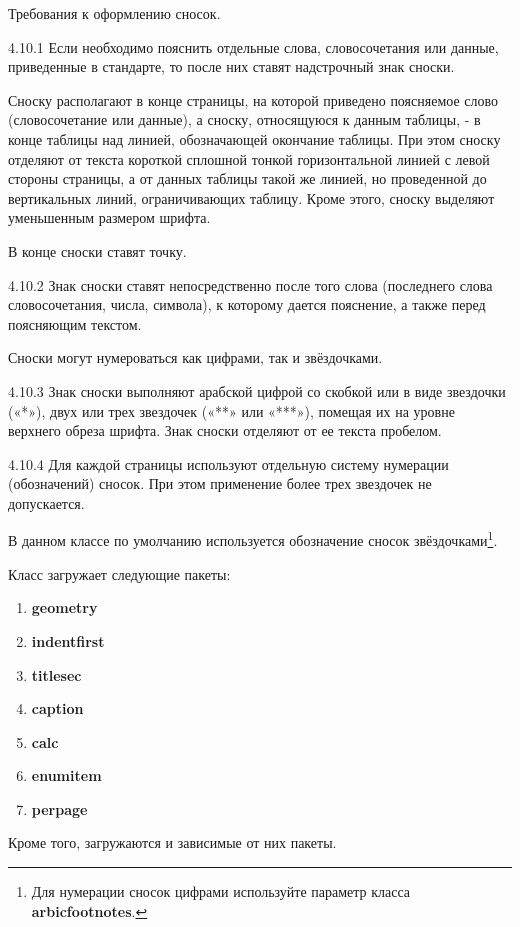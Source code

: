 \documentclass[12pt, twoside, final]{ruost}
\begin{document}
\begin{OST}
				\point Требования к оформлению сносок.
				
				\begin{stdquote}
					\par 4.10.1 Если необходимо пояснить отдельные слова, словосочетания или данные, приведенные в стандарте, то после них ставят надстрочный знак сноски.
					\par Сноску располагают в конце страницы, на которой приведено поясняемое слово (словосочетание или данные), а сноску, относящуюся к данным таблицы, - в конце таблицы над линией, обозначающей окончание таблицы. При этом сноску отделяют от текста короткой сплошной тонкой горизонтальной линией с левой стороны страницы, а от данных таблицы такой же линией, но проведенной до вертикальных линий, ограничивающих таблицу. Кроме этого, сноску выделяют уменьшенным размером шрифта.
					\par В конце сноски ставят точку.
					\par 4.10.2 Знак сноски ставят непосредственно после того слова (последнего слова словосочетания, числа, символа), к которому дается пояснение, а также перед поясняющим текстом.
					\par [ГОСТ 1.5---2001]
				\end{stdquote}
				
				\point\label{pnt:numfootnotes} Сноски могут нумероваться как цифрами, так и звёздочками.
				
				\begin{stdquote}
					\par 4.10.3 Знак сноски выполняют арабской цифрой со скобкой или в виде звездочки («*»), двух или трех звездочек («**» или «***»), помещая их на уровне верхнего обреза шрифта. Знак сноски отделяют от ее текста пробелом.
					\par 4.10.4 Для каждой страницы используют отдельную систему нумерации (обозначений) сносок. При этом применение более трех звездочек не допускается.
					\par [ГОСТ 1.5---2001]
				\end{stdquote}
				
				\point В данном классе по умолчанию используется обозначение сносок звёздочками\footnote{Для нумерации сносок цифрами используйте параметр класса \textbf{arbicfootnotes}.}.
					
				
		
			\point Класс загружает следующие пакеты:
				\begin{enumerate}
					\item \textbf{geometry}
					\item \textbf{indentfirst}
					\item \textbf{titlesec}
					\item \textbf{caption}
					\item \textbf{calc}
					\item \textbf{enumitem}
					\item \textbf{perpage}
				\end{enumerate}
				\subpoint Кроме того, загружаются и зависимые от них пакеты.
			

\end{OST}
\end{document}
